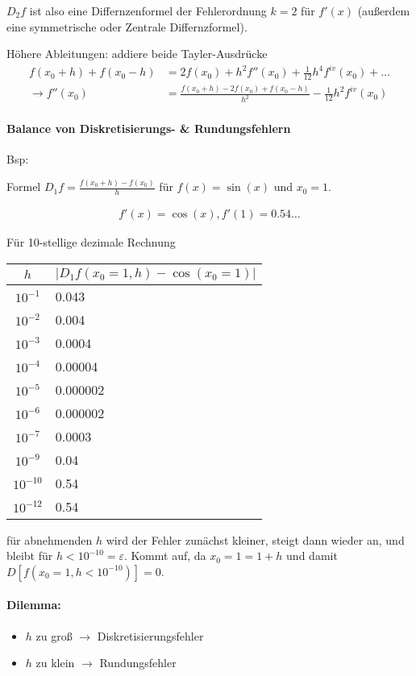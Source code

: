 \documentclass[a4paper,ngerman]{scrbook}
\begin{document}
$D_2f$ ist also eine Differnzenformel der Fehlerordnung $k=2$ für $f'(x)$ (außerdem  eine symmetrische oder Zentrale Differnzformel).

Höhere Ableitungen: addiere beide Tayler-Ausdrücke
\begin{align*}
  f(x_0+h) + f(x_0 -h ) &= 2f(x_0) + h^2 f''(x_0) + \frac{1}{12} h^4     f^{iv}(x_0) + \dots\\
\to f''(x_0) &= \frac{f(x_0 + h) - 2f(x_0)+f(x_0-h)}{h^2} - \frac{1}{12} h^2 f^{iv}(x_0)
\end{align*}

\paragraph{Balance von Diskretisierungs- \& Rundungsfehlern}

Bsp:

Formel $D_1f = \frac{f(x_0 + h) - f(x_0)}{h}$ für $f(x) = \sin(x)$ und $x_0 = 1$.

\begin{align*}
  f'(x) = \cos(x), f'(1) = 0.54\dots
\end{align*}

Für 10-stellige dezimale Rechnung

\begin{tabular}{c|l}
  $h$ & $|D_1f(x_0=1,h) - \cos(x_0=1)|$\\\hline
  $10^{-1}$ & 0.043\\
  $10^{-2}$ & 0.004\\
  $10^{-3}$ & 0.0004\\
  $10^{-4}$ & 0.00004\\
  $10^{-5}$ & 0.000002\\
  $10^{-6}$ & 0.000002\\
  $10^{-7}$ & 0.0003\\
  $10^{-9}$ & 0.04\\
  $10^{-10}$ & 0.54\\
  $10^{-12}$ & 0.54
\end{tabular}

für abnehmenden $h$ wird der Fehler zunächst kleiner, steigt dann wieder an, und bleibt für $h < 10^{-10} = \varepsilon$. Kommt auf, da $x_0 = 1 = 1 + h$ und damit $D[f(x_0=1, h< 10^{-10})] = 0$.

\paragraph{Dilemma:}

\begin{itemize}
\item $h$ zu groß $\to$ Diskretisierungsfehler
\item $h$ zu klein $\to$ Rundungsfehler
\end{itemize}
\end{document}
